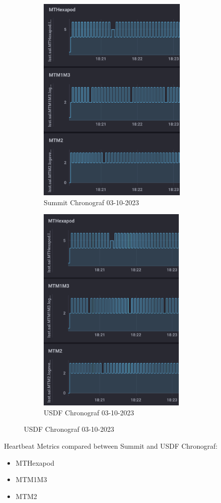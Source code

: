 \newpage
\begin{figure}
\centering
\begin{subfigure}{.5\textwidth}
  \centering
  \includegraphics[height=4in]{images/Summit_3.png}
  \caption{Summit Chronograf 03-10-2023}
  \label{fig:sub5}
\end{subfigure}%
\begin{subfigure}{.5\textwidth}
  \centering
  \includegraphics[height=4in]{images/USDF_3.png}
  \caption{USDF Chronograf 03-10-2023}
  \label{fig:sub6}
\end{subfigure}
\label{fig:image3}
\end{figure}
Heartbeat Metrics compared between Summit and USDF Chronograf:
\begin{itemize}
  \item MTHexapod
  \item MTM1M3
  \item MTM2
\end{itemize}

